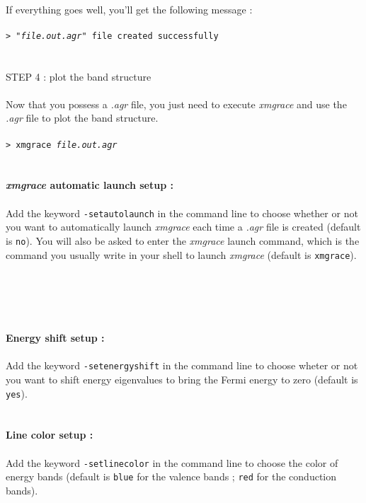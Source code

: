 \documentclass[prl]{article}
\begin{document}
\\
If everything goes well, you'll get the following message : \\
\\
\texttt{> "\textit{file.out.agr}"  file created successfully} \\
\\
\\
{\large{STEP 4 : plot the band structure}} \\
\\
Now that you possess a \textit{.agr} file, you just need to execute \textit{xmgrace} and use the \textit{.agr} file to plot the band structure. \\
\\
\texttt{> xmgrace \textit{file.out.agr}} \\
\\
\\
{\Large\textbf{\textit{xmgrace} automatic launch setup :}} \\
\\
Add the keyword \texttt{-setautolaunch} in the command line to choose whether or not you want to automatically launch \textit{xmgrace} each time a \textit{.agr} file is created (default is \texttt{no}). You will also be asked to enter the \textit{xmgrace} launch command, which is the command you usually write in your shell to launch \textit{xmgrace} (default is \texttt{xmgrace}). \\
\\
\\
\\
\\
\\
{\Large\textbf{Energy shift setup :}} \\
\\
Add the keyword \texttt{-setenergyshift} in the command line to choose wheter or not you want to shift energy eigenvalues to bring the Fermi energy to zero (default is \texttt{yes}). \\
\\
\\
{\Large\textbf{Line color setup :}} \\
\\
Add the keyword \texttt{-setlinecolor} in the command line to choose the color of energy bands (default is \texttt{blue} for the valence bands ; \texttt{red} for the conduction bands). \\
\end{document}
